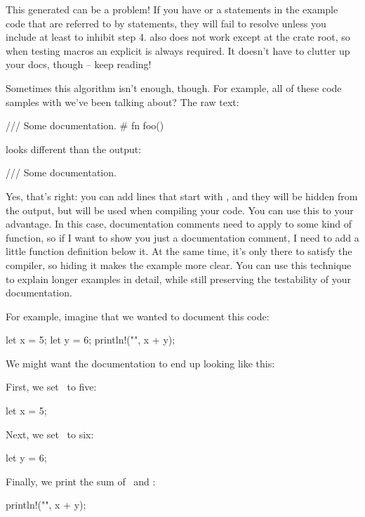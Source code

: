 This generated  can be a problem! If you have  or a  statements in the example code that 
are referred to by  statements, they will fail to resolve unless you include at least  to inhibit step 4. 
 also does not work except at the crate root, so when testing macros an explicit  is 
always required. It doesn't have to clutter up your docs, though -- keep reading!

\blank

Sometimes this algorithm isn't enough, though. For example, all of these code samples with \code{///} we've been talking about? The raw text:

\begin{rustc}
/// Some documentation.
# fn foo() {}
\end{rustc}

looks different than the output:

\begin{rustc}
/// Some documentation.
\end{rustc}

Yes, that's right: you can add lines that start with \code{\#}, and they will be hidden from the output, but will be used when 
compiling your code. You can use this to your advantage. In this case, documentation comments need to apply to some kind of function, 
so if I want to show you just a documentation comment, I need to add a little function definition below it. At the same time, it's 
only there to satisfy the compiler, so hiding it makes the example more clear. You can use this technique to explain longer examples 
in detail, while still preserving the testability of your documentation.

\blank

For example, imagine that we wanted to document this code:

\begin{rustc}
let x = 5;
let y = 6;
println!("{}", x + y);
\end{rustc}

We might want the documentation to end up looking like this:

\begin{myquote}
First, we set \x\ to five:

\begin{rustc}
let x = 5;
\end{rustc}

Next, we set \y\ to six:

\begin{rustc}
let y = 6;
\end{rustc}

Finally, we print the sum of \x\ and \y:

\begin{rustc}
println!("{}", x + y);
\end{rustc}
\end{myquote}

